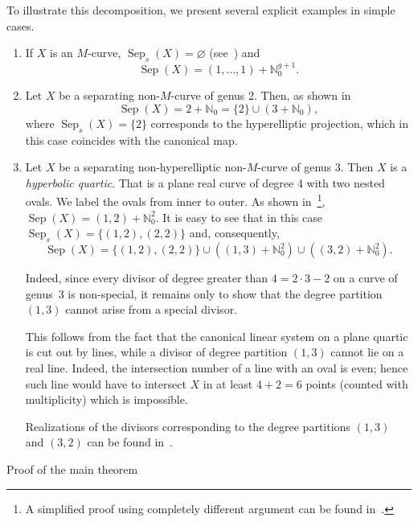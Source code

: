 \documentclass[x11names,oneside,11pt]{amsart}
\makeatletter
\theoremstyle{definition}
\theoremstyle{remark}
\DeclareMathOperator{\Sep}{Sep}
\newcommand{\N}{\mathbb{N}}
\renewcommand{\section}{%
  \@startsection{section}{1}%
    \z@{.7\linespacing\@plus\linespacing}{.5\linespacing}%
    {\normalfont\bfseries\centering}%
}
\makeatother
\begin{document}
    To illustrate this decomposition, we present several explicit examples in simple cases.
    
    \begin{enumerate}
      \item If $X$ is an $M$-curve, $\Sep_s(X) = \varnothing$ (see~\cite{huisman_geometry_2001}) and 
      \[
        \Sep(X) = (1, \ldots, 1) + \N_0^{g+1}.
      \]

      \item Let $X$ be a separating non-$M$-curve of genus 2. Then, as shown in~\cite[Example 2.5]{kummer_separating_2020}
      \[
        \Sep(X) = 2 + \N_0 = \{ 2 \}  \cup \left( 3 + \N_0 \right),
      \]
      where $\Sep_s(X) = \{ 2 \}$ corresponds to the hyperelliptic projection, which in this case coincides with the canonical map.

      \item Let $X$ be a separating non-hyperelliptic non-$M$-curve of genus 3. Then $X$ is a {\em hyperbolic quartic}. That is a plane real curve of degree 4 with two nested ovals. We label the ovals from inner to outer. As shown in~\cite{orevkov_separating_2019}\footnote{A simplified proof using completely different argument can be found in~\cite[Example 3.3]{orevkov_algebraically_2021}.}, $\Sep(X) = (1, 2)+\N_0^2$. It is easy to see that in this case $\Sep_s(X) = \{ (1, 2), (2, 2) \}$ and, consequently, 
      \[
        \Sep(X) = \{ (1, 2), (2, 2)\} \cup \left( (1, 3)+ \N_0^2 \right) \cup \left( (3, 2) + \N_0^2 \right). 
      \]

      Indeed, since every divisor of degree greater than $4 = 2\cdot 3 - 2$ on a curve of genus~3 is non-special, it remains only to show that the degree partition $(1,3)$ cannot arise from a special divisor. 

      This follows from the fact that the canonical linear system on a plane quartic is cut out by lines, while a divisor of degree partition $(1,3)$ cannot lie on a real line. Indeed, the intersection number of a line with an oval is even; hence such line  would have to intersect $X$ in at least $4+2 = 6$ points (counted with multiplicity) which is impossible. 

       Realizations of the divisors corresponding to the degree partitions $(1,3)$ and $(3,2)$ can be found in~\cite[Example 3.8]{kummer_separating_2020}.  
    \end{enumerate}   

  
  \section{Proof of the main theorem}\label{main_theorem_proof}
  
\end{document}
